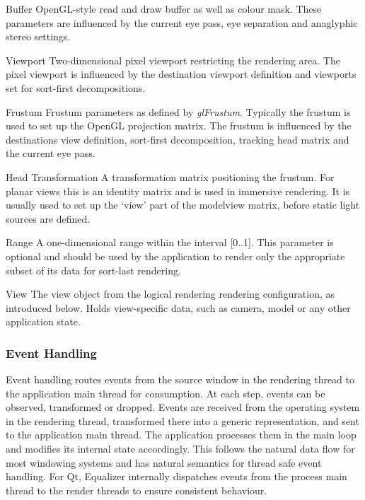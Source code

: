 \begin{compactdesc}

 \item[Buffer] OpenGL-style read and draw buffer as well as colour mask. These
 parameters are influenced by the current eye pass, eye separation and
 anaglyphic stereo settings.

 \item[Viewport] Two-dimensional pixel viewport restricting the rendering area.
 The pixel viewport is influenced by the destination viewport definition and
 viewports set for sort-first decompositions.

 \item[Frustum] Frustum parameters as defined by {\em glFrustum}. Typically
 the frustum is used to set up the OpenGL projection matrix. The frustum is
 influenced by the destinations view definition, sort-first decomposition,
 tracking head matrix and the current eye pass.

 \item[Head Transformation] A transformation matrix positioning the frustum. For
 planar views this is an identity matrix and is used in immersive rendering.
 It is usually used to set up the `view' part of the modelview matrix, before
 static light sources are defined.
 \item[Range] A one-dimensional range within the interval [0..1]. This parameter is
 optional and should be used by the application to render only the appropriate
 subset of its data for sort-last rendering.

\item[View] The view object from the logical rendering rendering configuration,
as introduced below. Holds view-specific data, such as camera, model or any other
application state.

\end{compactdesc}

\subsubsection{Event Handling}

Event handling routes events from the source window in the rendering thread to
the application main thread for consumption. At each step, events can be
observed, transformed or dropped. Events are received from the operating system
in the rendering thread, transformed there into a generic representation, and
sent to the application main thread. The application processes them in the main
loop and modifies its internal state accordingly. This follows the natural data
flow for most windowing systems and has natural semantics for thread safe
event handling. For Qt, Equalizer internally dispatches events from the process
main thread to the render threads to ensure consistent behaviour.

